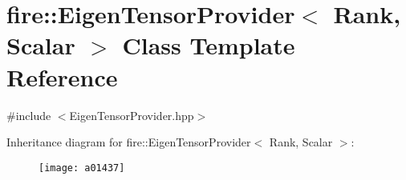 \hypertarget{a01437}{}\section{fire\+:\+:Eigen\+Tensor\+Provider$<$ Rank, Scalar $>$ Class Template Reference}
\label{a01437}


{\ttfamily \#include $<$Eigen\+Tensor\+Provider.\+hpp$>$}

Inheritance diagram for fire\+:\+:Eigen\+Tensor\+Provider$<$ Rank, Scalar $>$\+:\begin{figure}[H]
\begin{center}
\leavevmode
\texttt{[image: a01437]}
\end{center}
\end{figure}
